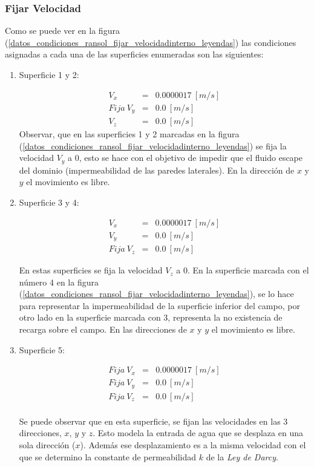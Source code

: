 \documentclass[10pt,a4paper,final]{article}
\begin{document}
\subsubsection*{Fijar Velocidad}
Como se puede ver en la figura (\ref{datos_condiciones_ransol_fijar_velocidadinterno_leyendas}) las condiciones asignadas a cada una de las superficies enumeradas son las siguientes:

\begin{enumerate}

\item Superficie 1 y 2:

\begin{eqnarray*}
V_x&=&0.0000017~[m/s]\\
Fija~V_y&=&0.0~[m/s]\\
V_z&=&0.0~[m/s]
\end{eqnarray*}
Observar, que en las superficies 1 y 2 marcadas en la figura (\ref{datos_condiciones_ransol_fijar_velocidadinterno_leyendas}) se fija la velocidad $V_y$ a $0$, esto se hace con el objetivo de impedir que el fluido escape del dominio (impermeabilidad de las paredes laterales). En la dirección de $x$ y $y$ el movimiento es libre.

\item Superficie 3 y 4:

\begin{eqnarray*}
V_x&=&0.0000017~[m/s]\\
V_y&=&0.0~[m/s]\\
Fija~V_z&=&0.0~[m/s]
\end{eqnarray*}

En estas superficies se fija la velocidad $V_z$ a $0$. En la superficie marcada con el número 4 en la figura (\ref{datos_condiciones_ransol_fijar_velocidadinterno_leyendas}), se lo hace para representar la impermeabilidad de la superficie inferior del campo, por otro lado en la superficie marcada con 3, representa la no existencia de recarga sobre el campo. En las direcciones de $x$ y $y$ el movimiento es libre.

\item Superficie 5:

\begin{eqnarray*}
Fija~V_x&=&0.0000017~[m/s]\\
Fija~V_y&=&0.0~[m/s]\\
Fija~V_z&=&0.0~[m/s]\\
\end{eqnarray*}

Se puede observar que en esta superficie, se fijan las velocidades en las 3 direcciones, $x$, $y$ y $z$. Esto modela la entrada de agua que se desplaza en una sola dirección ($x$). Además ese desplazamiento es a la misma velocidad con el que se determino la constante de permeabilidad $k$ de la \emph{Ley de Darcy}.

\end{enumerate}
\end{document}
